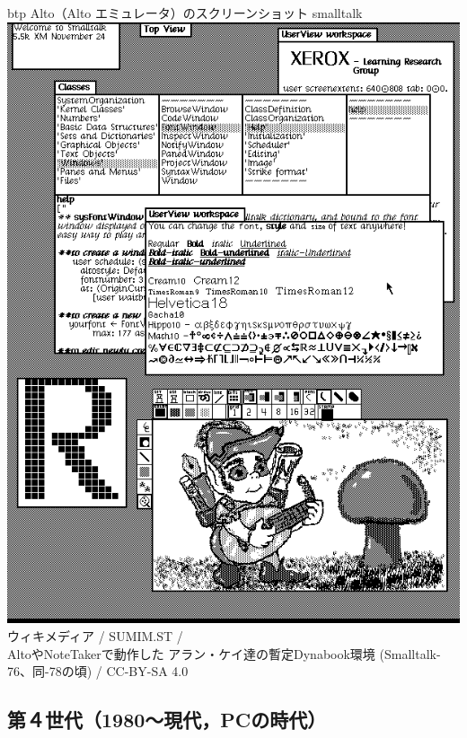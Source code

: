 \begin{itemize}
  \begin{myfig}{btp}
    {Alto（Alto エミュレータ）のスクリーンショット}
    {smalltalk}
    \includegraphics[scale=0.5]{Photo/Smalltalk-76.png}\\
                    {\small
                      ウィキメディア /
                      SUMIM.ST /\\
                      AltoやNoteTakerで動作した
                      アラン・ケイ達の暫定Dynabook環境
                      (Smalltalk-76、同-78の頃) /
                      CC-BY-SA 4.0
                    }
  \end{myfig}

\end{itemize}

\subsection{第４世代（1980〜現代，PCの時代）}

